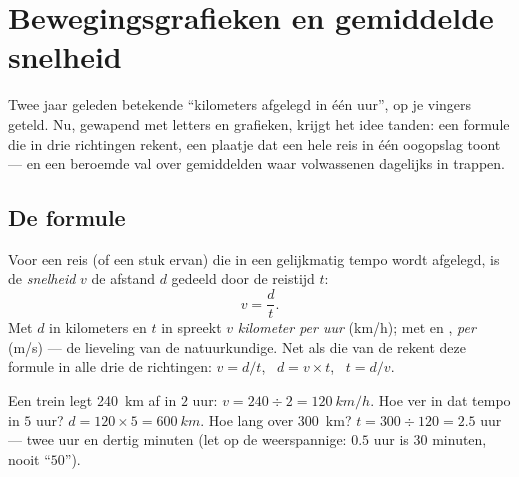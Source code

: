 \chapter{Bewegingsgrafieken en gemiddelde snelheid}\label{ch:g7:motion-average-speed}

Twee jaar geleden betekende  ``kilometers afgelegd in één uur'',
op je vingers geteld. Nu, gewapend met letters en grafieken, krijgt het
idee tanden: een formule die in drie richtingen rekent, een plaatje dat
een hele reis in één oogopslag toont --- en een beroemde val over
gemiddelden waar volwassenen dagelijks in trappen.

\section{De formule}

\begin{definition}\label{def:g7:motion-average-speed:formula}
Voor een reis (of een stuk ervan) die in een gelijkmatig tempo wordt
afgelegd, is de \emph{snelheid} $v$ de afstand $d$
gedeeld door de reistijd $t$:
\[
v = \frac{d}{t}.
\]
Met $d$ in kilometers en $t$ in  spreekt $v$
\emph{kilometer per uur} (\unit{km/h}); met  en ,
\emph{ per } (\unit{m/s}) --- de lieveling van de
natuurkundige. Net als die van de  rekent deze formule in
alle drie de richtingen: $v = d/t$, \ $d = v \times t$, \
$t = d/v$.
\end{definition}

\begin{example}\label{ex:g7:motion-average-speed:recipes}
Een trein legt \qty{240}{km} af in $2$ uur: $v = 240 \div 2 =
\qty{120}{km/h}$. Hoe ver in dat tempo in $5$ uur? $d = 120
\times 5 = \qty{600}{km}$. Hoe lang over \qty{300}{km}? $t = 300
\div 120 = 2.5$ uur --- twee uur en dertig minuten (let op de
weerspannige: $0.5$ uur is $30$ minuten, nooit ``$50$'').
\end{example}

